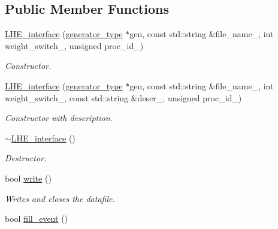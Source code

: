 \subsection*{Public Member Functions}
\begin{DoxyCompactItemize}
\item 
\hypertarget{a00327_ab899574bcfbb64ccfcf32115e29b8d3f}{}\hyperlink{a00327_ab899574bcfbb64ccfcf32115e29b8d3f}{L\+H\+E\+\_\+interface} (\hyperlink{a00451}{generator\+\_\+type} $\ast$gen, const std\+::string \&file\+\_\+name\+\_\+, int weight\+\_\+switch\+\_\+, unsigned proc\+\_\+id\+\_)\label{a00327_ab899574bcfbb64ccfcf32115e29b8d3f}

\begin{DoxyCompactList}\small\item\em Constructor. \end{DoxyCompactList}\item 
\hypertarget{a00327_a3e407eda72246cf24b54b4154c9c845a}{}\hyperlink{a00327_a3e407eda72246cf24b54b4154c9c845a}{L\+H\+E\+\_\+interface} (\hyperlink{a00451}{generator\+\_\+type} $\ast$gen, const std\+::string \&file\+\_\+name\+\_\+, int weight\+\_\+switch\+\_\+, const std\+::string \&descr\+\_\+, unsigned proc\+\_\+id\+\_)\label{a00327_a3e407eda72246cf24b54b4154c9c845a}

\begin{DoxyCompactList}\small\item\em Constructor with description. \end{DoxyCompactList}\item 
\hypertarget{a00327_aa054e0ffb00c9136509cf6b136446026}{}\hyperlink{a00327_aa054e0ffb00c9136509cf6b136446026}{$\sim$\+L\+H\+E\+\_\+interface} ()\label{a00327_aa054e0ffb00c9136509cf6b136446026}

\begin{DoxyCompactList}\small\item\em Destructor. \end{DoxyCompactList}\item 
\hypertarget{a00327_a563ae5ac0c1389fea0bd7616eef95ca3}{}bool \hyperlink{a00327_a563ae5ac0c1389fea0bd7616eef95ca3}{write} ()\label{a00327_a563ae5ac0c1389fea0bd7616eef95ca3}

\begin{DoxyCompactList}\small\item\em Writes and closes the datafile. \end{DoxyCompactList}\item 
\hypertarget{a00327_a1815dc45320bbf0d041064bdf1521317}{}bool \hyperlink{a00327_a1815dc45320bbf0d041064bdf1521317}{fill\+\_\+event} ()\label{a00327_a1815dc45320bbf0d041064bdf1521317}


\end{DoxyCompactItemize}
